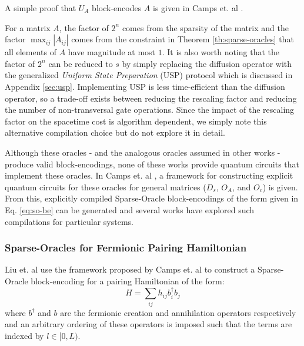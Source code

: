 A simple proof that $U_A$ block-encodes $A$ is given in Camps et. al \cite{camps2024explicit}.

For a matrix $A$, the factor of $2^n$ comes from the sparsity of the matrix and the factor $\max_{ij} {|A_{ij}|}$ comes from the constraint in Theorem \ref{th:sparse-oracles} that all elements of $A$ have magnitude at most $1$.
It is also worth noting that the factor of $2^n$ can be reduced to $s$ by simply replacing the diffusion operator with the generalized \textit{Uniform State Preparation} (USP) protocol which is discussed in Appendix \ref{sec:usp}.
Implementing USP is less time-efficient than the diffusion operator, so a trade-off exists between reducing the rescaling factor and reducing the number of non-transversal gate operations.
Since the impact of the rescaling factor on the spacetime cost is algorithm dependent, we simply note this alternative compilation choice but do not explore it in detail. 

Although these oracles - and the analogous oracles assumed in other works \cite{berry2009black, childs2009universal, berry2015hamiltonian, berry2015simulating,low2017optimal,childs2017quantum,gilyen2019quantum} - produce valid block-encodings, none of these works provide quantum circuits that implement these oracles.
In Camps et. al \cite{camps2024explicit}, a framework for constructing explicit quantum circuits for these oracles for general matrices ($D_s$, $O_A$, and $O_c$) is given.
From this, explicitly compiled Sparse-Oracle block-encodings of the form given in Eq. \ref{eq:so-be} can be generated and several works \cite{camps2022fable, liu2024efficient, sanavio2024explicit}  have explored such compilations for particular systems. 

\subsubsection{Sparse-Oracles for Fermionic Pairing Hamiltonian}

Liu et. al \cite{liu2024efficient} use the framework proposed by Camps et. al \cite{camps2024explicit} to construct a Sparse-Oracle block-encoding for a pairing Hamiltonian of the form:
\begin{equation}
    \label{eq:pairing-ham}
    H = \sum_{ij}h_{ij}b^\dagger_i b_j
\end{equation}
where $b^\dagger$ and $b$ are the fermionic creation and annihilation operators respectively and an arbitrary ordering of these operators is imposed such that the terms are indexed by $l \in [0, L)$.

